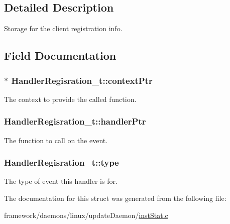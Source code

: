 \subsection{Detailed Description}
Storage for the client registration info. 

\subsection{Field Documentation}
\subsubsection[{\texorpdfstring{context\+Ptr}{contextPtr}}]{$\ast$ Handler\+Regisration\+\_\+t\+::context\+Ptr}\hypertarget{struct_handler_regisration__t_af33299bec2c5d2c3333e961b12efc5c2}{}\label{struct_handler_regisration__t_af33299bec2c5d2c3333e961b12efc5c2}


The context to provide the called function. 

\subsubsection[{\texorpdfstring{handler\+Ptr}{handlerPtr}}]{ Handler\+Regisration\+\_\+t\+::handler\+Ptr}\hypertarget{struct_handler_regisration__t_af8a268db6cdae829281d774129f798c9}{}\label{struct_handler_regisration__t_af8a268db6cdae829281d774129f798c9}


The function to call on the event. 

\subsubsection[{\texorpdfstring{type}{type}}]{ Handler\+Regisration\+\_\+t\+::type}\hypertarget{struct_handler_regisration__t_a15e1fea409a7f2eb64a899aaa42e8c52}{}\label{struct_handler_regisration__t_a15e1fea409a7f2eb64a899aaa42e8c52}


The type of event this handler is for. 



The documentation for this struct was generated from the following file\+:\begin{DoxyCompactItemize}
\item 
framework/daemons/linux/update\+Daemon/\hyperlink{inst_stat_8c}{inst\+Stat.\+c}\end{DoxyCompactItemize}
